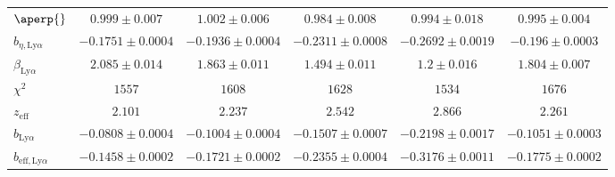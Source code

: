 \begin{table}[h]
\begin{tabular}{lccccc}
$\aperp{} $ & $ 0.999 \pm 0.007$ & $ 1.002 \pm 0.006$ & $ 0.984 \pm 0.008$ & $ 0.994 \pm 0.018$ & $ 0.995 \pm 0.004$ \\
$b_{\eta, \mathrm{Ly}\alpha} $ & $ -0.1751 \pm 0.0004$ & $ -0.1936 \pm 0.0004$ & $ -0.2311 \pm 0.0008$ & $ -0.2692 \pm 0.0019$ & $ -0.196 \pm 0.0003$ \\
$\beta_{\mathrm{Ly}\alpha} $ & $ 2.085 \pm 0.014$ & $ 1.863 \pm 0.011$ & $ 1.494 \pm 0.011$ & $ 1.2 \pm 0.016$ & $ 1.804 \pm 0.007$ \\
\midrule
$\chi^2$ & $ 1557 $ & $ 1608 $ & $ 1628 $ & $ 1534 $ & $ 1676 $ \\
$z_{\mathrm{eff}}$ & $ 2.101 $ & $ 2.237 $ & $ 2.542 $ & $ 2.866 $ & $ 2.261 $ \\
\midrule
$b_{\mathrm{Ly}\alpha} $ & $ -0.0808 \pm 0.0004$ & $ -0.1004 \pm 0.0004$ & $ -0.1507 \pm 0.0007$ & $ -0.2198 \pm 0.0017$ & $ -0.1051 \pm 0.0003$ \\
$b_{\mathrm{eff}, \mathrm{Ly}\alpha} $ & $ -0.1458 \pm 0.0002$ & $ -0.1721 \pm 0.0002$ & $ -0.2355 \pm 0.0004$ & $ -0.3176 \pm 0.0011$ & $ -0.1775 \pm 0.0002$ \\
\bottomrule
  \end{tabular}
\end{table}

